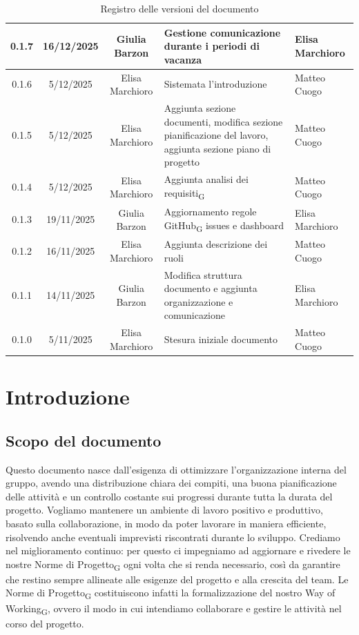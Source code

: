 \documentclass[11pt,a4paper]{article}
\newcommand{\gls}[1]{#1\textsubscript{G}}
\begin{document}
\begin{table}[H]
\begin{tabular}{|c|c|c|>{\raggedright\arraybackslash}p{}|p{}|}
        \hline
        0.1.7 & 16/12/2025 & Giulia Barzon & Gestione comunicazione durante i periodi di vacanza & Elisa Marchioro\\
        \hline
        0.1.6 & 5/12/2025 & Elisa Marchioro & Sistemata l'introduzione & Matteo Cuogo\\
        \hline
        0.1.5 & 5/12/2025 & Elisa Marchioro & Aggiunta sezione documenti, modifica sezione pianificazione del lavoro, aggiunta sezione piano di progetto & Matteo Cuogo\\
        \hline
        0.1.4 & 5/12/2025 & Elisa Marchioro & Aggiunta \gls{analisi dei requisiti} & Matteo Cuogo\\
        \hline
        0.1.3 & 19/11/2025 & Giulia Barzon & Aggiornamento regole \gls{GitHub} issues e dashboard & Elisa Marchioro\\
        \hline
        0.1.2 & 16/11/2025 & Elisa Marchioro & Aggiunta descrizione dei ruoli & Matteo Cuogo\\
        \hline
        0.1.1 & 14/11/2025 & Giulia Barzon & Modifica struttura documento e aggiunta organizzazione e comunicazione & Elisa Marchioro\\
        \hline
        0.1.0 & 5/11/2025 & Elisa Marchioro & Stesura iniziale documento & Matteo Cuogo \\
        \hline
    \end{tabular}
    \caption{Registro delle versioni del documento}
    \label{tab:versionamento}
\end{table}

\newpage

\tableofcontents
\newpage

\section{Introduzione}
\subsection{Scopo del documento}
Questo documento nasce dall’esigenza di ottimizzare l’organizzazione interna del gruppo, avendo una distribuzione chiara dei compiti, una buona pianificazione delle attività e un controllo costante sui progressi durante tutta la durata del progetto. Vogliamo mantenere un ambiente di
lavoro positivo e produttivo, basato sulla collaborazione, in modo da poter lavorare in maniera efficiente, risolvendo anche eventuali imprevisti riscontrati durante lo sviluppo.
Crediamo nel miglioramento continuo: per questo ci impegniamo ad aggiornare e rivedere le nostre \gls{Norme di Progetto} ogni volta che si renda necessario, così da garantire che restino sempre allineate alle esigenze del progetto e alla crescita del team. Le \gls{Norme di Progetto} costituiscono infatti la formalizzazione del nostro \gls{Way of Working}, ovvero il modo in cui intendiamo collaborare e gestire le attività nel corso del progetto.
\end{document}
